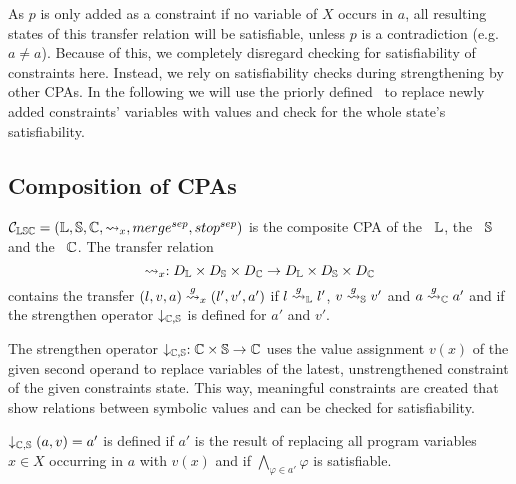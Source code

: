 As $p$ is only added as a constraint if no variable of $X$ occurs in $a$, all resulting states of this transfer relation will be satisfiable, unless $p$ is a contradiction (e.g. $a \neq a$). Because of this, we completely disregard checking for satisfiability of constraints here.
Instead, we rely on satisfiability checks during strengthening by other CPAs.
In the following we will use the priorly defined \symbolicValueCPA\ to replace newly added constraints' variables with values and check for the whole state's satisfiability.

\subsection{Composition of CPAs}
$\mathcal{C}_{\mathbb{L}\mathbb{S}\mathbb{C}} = (\mathbb{L}, \mathbb{S}, \mathbb{C}, \rightsquigarrow_x, merge^{sep}, stop^{sep})$ is the composite CPA of the \locationCPA\ $\mathbb{L}$, the \symbolicValueCPA\ $\mathbb{S}$ and the \constraintsCPA\ $\mathbb{C}$.
The transfer relation \[\rightsquigarrow_x : D_{\mathbb{L}} \times D_{\mathbb{S}} \times D_{\mathbb{C}} \rightarrow D_{\mathbb{L}} \times D_{\mathbb{S}} \times D_{\mathbb{C}}\] contains
the transfer $(l, v, a) \overset{g}{\rightsquigarrow}_x (l', v', a')$ if 
            $l \overset{g}{\rightsquigarrow}_{\mathbb{L}} l'$,
            $v \overset{g}{\rightsquigarrow}_{\mathbb{S}} v'$ and
            $a \overset{g}{\rightsquigarrow}_{\mathbb{C}} a'$ and
            if the strengthen operator $\downarrow_{\mathbb{C}, \mathbb{S}}$ is defined for $a'$ and $v'$.

The strengthen operator $\downarrow_{\mathbb{C}, \mathbb{S}} : \mathbb{C} \times \mathbb{S} \rightarrow \mathbb{C}$ uses the value assignment $v(x)$ of the given second operand to replace variables of the latest, unstrengthened constraint of the given constraints state. This way, meaningful constraints are created that show relations between symbolic values and can be checked for satisfiability.

$\downarrow_{\mathbb{C}, \mathbb{S}} (a, v) = a'$ is defined if $a'$ is the result of replacing all program variables $x \in X$ occurring in $a$ with $v(x)$ and if $\displaystyle\bigwedge_{\varphi \in a'} \varphi$ is satisfiable.

